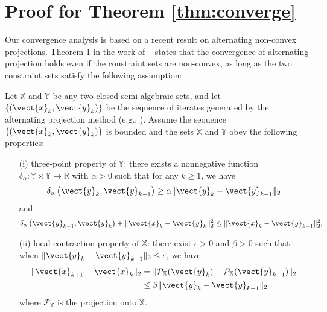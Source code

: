\section{Proof for Theorem \ref{thm:converge}}\label{sec:proof}
Our convergence analysis is based on a recent result on alternating
non-convex projections. Theorem 1 in the work of ~\citet{zhu2018convergence}
states that the convergence of alternating projection holds even if the
constraint sets are non-convex, as long as the two constraint sets satisfy the following
assumption:

\begin{assumption}\label{asp:ap}
Let $ \mathbb{X}$ and $\mathbb{Y}$ be any two closed semi-algebraic sets, and let $\left\lbrace \left( \vect{x}_k, \vect{y}_k \right)  \right\rbrace $ be the sequence of iterates generated by the alternating projection method (e.g., \name{}). Assume the sequence $\left\lbrace \left( \vect{x}_k, \vect{y}_k \right)  \right\rbrace $ is bounded and the sets $ \mathbb{X}$ and $\mathbb{Y}$ obey the following properties: 
\begin{enumerate}
\item[(i)]  three-point property of $\mathbb{Y}$:  there exists a nonnegative function $\delta_{\alpha}: \mathbb{Y} \times \mathbb{Y} \rightarrow \mathbb{R}$ with $\alpha > 0$ such that for any $k \geq 1$, we have
\begin{equation*}
  \delta_{\alpha} \left( \vect{y}_k, \vect{y}_{k-1} \right) \geq \alpha  \|\vect{y}_k- \vect{y}_{k-1}\|_2
\end{equation*}
and 
\begin{equation*}
  \delta_{\alpha} \left(  \vect{y}_{k-1}, \vect{y}_k \right) + \| \vect{x}_k-\vect{y}_k \|_2^2 \\
  \leq  \| \vect{x}_k-\vect{y}_{k-1} \|_2^2, %
\end{equation*}
\item[(ii)]  local contraction property of $ \mathbb{X}$:  there exist $\epsilon>0$ and $\beta>0$ such that when $\|\vect{y}_k-\vect{y}_{k-1}\|_2\leq \epsilon$, we have 
\begin{align*}
  \| \vect{x}_{k+1}-\vect{x}_k \|_2 & = \| \mathcal{P}_{ \mathbb{X}} (\vect{y}_k )- \mathcal{P}_{ \mathbb{X}} (\vect{y}_{k-1} )  \|_2 \\
  & \leq \beta \|  \vect{y}_k-\vect{y}_{k-1}  \|_2 
\end{align*}
where $\mathcal{P}_{ \mathbb{X}}$ is the projection onto ${ \mathbb{X}}$. 
\end{enumerate}
\end{assumption}


